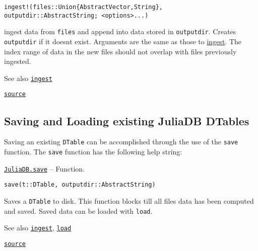 \documentclass{memoir}
\begin{document}
\begin{adjustwidth}{2em}{0pt}


\begin{lstlisting}
ingest!(files::Union{AbstractVector,String}, outputdir::AbstractString; <options>...)
\end{lstlisting}

ingest data from \texttt{files} and append into data stored in \texttt{outputdir}. Creates \texttt{outputdir} if it doesn{\textquotesingle}t exist. Arguments are the same as those to \href{@ref}{ingest}. The index range of data in the new files should not overlap with files previously ingested.

See also \href{@ingest}{\texttt{ingest}}



\href{https://github.com/JuliaComputing/JuliaDB.jl/tree/9e65f8c3b0e9c2e27c3334a093a5aefc6c7d1246/src/ingest.jl#L42-L50}{\texttt{source}}


\end{adjustwidth}

\hypertarget{14624391558619037012}{}


\subsection{Saving and Loading existing JuliaDB DTables}



Saving an existing \texttt{DTable} can be accomplished through the use of the \texttt{save} function.  The \texttt{save} function has the following help string:


\hypertarget{3464975534109264419}{} 
\hyperlink{3464975534109264419}{\texttt{JuliaDB.save}}  -- {Function.}

\begin{adjustwidth}{2em}{0pt}


\begin{lstlisting}
save(t::DTable, outputdir::AbstractString)
\end{lstlisting}

Saves a \texttt{DTable} to disk. This function blocks till all files data has been computed and saved. Saved data can be loaded with \texttt{load}.

See also \href{tutorial.html\#JuliaDB.ingest}{\texttt{ingest}}, \href{tutorial.html\#JuliaDB.load}{\texttt{load}}



\href{https://github.com/JuliaComputing/JuliaDB.jl/tree/9e65f8c3b0e9c2e27c3334a093a5aefc6c7d1246/src/ingest.jl#L158-L166}{\texttt{source}}


\end{adjustwidth}
\end{document}
